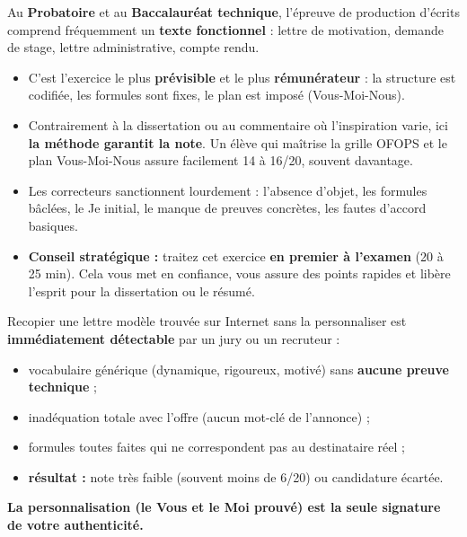\documentclass[11pt]{article}
\begin{document}
\begin{savaistu}
Au \textbf{Probatoire} et au \textbf{Baccalauréat technique}, l'épreuve de production d'écrits comprend fréquemment un \textbf{texte fonctionnel} : lettre de motivation, demande de stage, lettre administrative, compte rendu.
\begin{itemize}
\item C'est l'exercice le plus \textbf{prévisible} et le plus \textbf{rémunérateur} : la structure est codifiée, les formules sont fixes, le plan est imposé (Vous-Moi-Nous).
\item Contrairement à la dissertation ou au commentaire où l'inspiration varie, ici \textbf{la méthode garantit la note}. Un élève qui maîtrise la grille OFOPS et le plan Vous-Moi-Nous assure facilement 14 à 16/20, souvent davantage.
\item Les correcteurs sanctionnent lourdement : l'absence d'objet, les formules bâclées, le \og Je\fg{} initial, le manque de preuves concrètes, les fautes d'accord basiques.
\item \textbf{Conseil stratégique :} traitez cet exercice \textbf{en premier à l'examen} (20 à 25 min). Cela vous met en confiance, vous assure des points rapides et libère l'esprit pour la dissertation ou le résumé.
\end{itemize}
\end{savaistu}

\begin{attention}
Recopier une lettre modèle trouvée sur Internet sans la personnaliser est \textbf{immédiatement détectable} par un jury ou un recruteur :
\begin{itemize}
\item vocabulaire générique (\og dynamique, rigoureux, motivé\fg) sans \textbf{aucune preuve technique} ;
\item inadéquation totale avec l'offre (aucun mot-clé de l'annonce) ;
\item formules toutes faites qui ne correspondent pas au destinataire réel ;
\item \textbf{résultat :} note très faible (souvent moins de 6/20) ou candidature écartée.
\end{itemize}
\textbf{La personnalisation (le \og Vous\fg{} et le \og Moi\fg{} prouvé) est la seule signature de votre authenticité.}
\end{attention}
\end{document}
